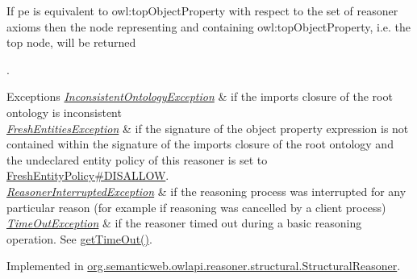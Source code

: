 If {\ttfamily pe} is equivalent to {\ttfamily owl\-:top\-Object\-Property} with respect to the set of reasoner axioms then the node representing and containing {\ttfamily owl\-:top\-Object\-Property}, i.\-e. the top node, will be returned 

.


\begin{DoxyExceptions}{Exceptions}
{\em \hyperlink{classorg_1_1semanticweb_1_1owlapi_1_1reasoner_1_1_inconsistent_ontology_exception}{Inconsistent\-Ontology\-Exception}} & if the imports closure of the root ontology is inconsistent \\
\hline
{\em \hyperlink{classorg_1_1semanticweb_1_1owlapi_1_1reasoner_1_1_fresh_entities_exception}{Fresh\-Entities\-Exception}} & if the signature of the object property expression is not contained within the signature of the imports closure of the root ontology and the undeclared entity policy of this reasoner is set to \hyperlink{enumorg_1_1semanticweb_1_1owlapi_1_1reasoner_1_1_fresh_entity_policy_a762eae6d5b2449d125311ecaabfdc8d0}{Fresh\-Entity\-Policy\#\-D\-I\-S\-A\-L\-L\-O\-W}. \\
\hline
{\em \hyperlink{classorg_1_1semanticweb_1_1owlapi_1_1reasoner_1_1_reasoner_interrupted_exception}{Reasoner\-Interrupted\-Exception}} & if the reasoning process was interrupted for any particular reason (for example if reasoning was cancelled by a client process) \\
\hline
{\em \hyperlink{classorg_1_1semanticweb_1_1owlapi_1_1reasoner_1_1_time_out_exception}{Time\-Out\-Exception}} & if the reasoner timed out during a basic reasoning operation. See \hyperlink{interfaceorg_1_1semanticweb_1_1owlapi_1_1reasoner_1_1_o_w_l_reasoner_a44b2c968f989afe5290db29c90faa164}{get\-Time\-Out()}. \\
\hline
\end{DoxyExceptions}


Implemented in \hyperlink{classorg_1_1semanticweb_1_1owlapi_1_1reasoner_1_1structural_1_1_structural_reasoner_af258423eb19191a677ca79ea792cb1e2}{org.\-semanticweb.\-owlapi.\-reasoner.\-structural.\-Structural\-Reasoner}.

